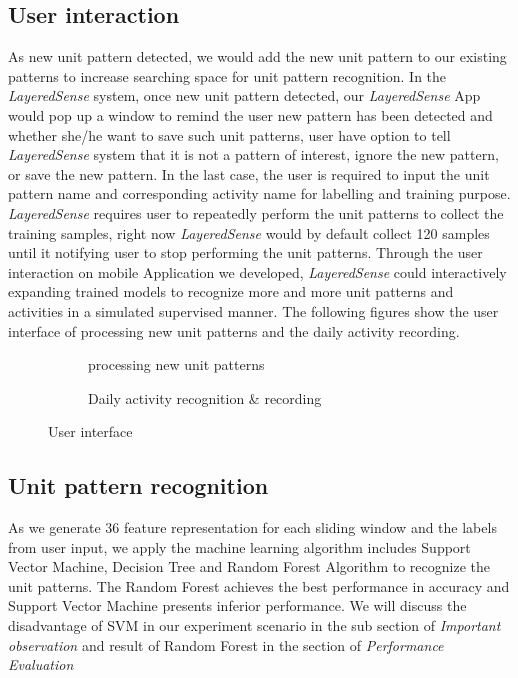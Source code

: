 \documentclass[a4paper, 10pt, conference]{IEEEtran}      %
\begin{document}
\subsection{User interaction}
As new unit pattern detected, we would add the new unit pattern to our existing patterns to increase searching space for unit pattern recognition. In the \emph{LayeredSense} system, once new unit pattern  detected, our \emph{LayeredSense} App would pop up a window to remind the user new pattern has been detected and whether she/he want to save such unit patterns, user have option to tell \emph{LayeredSense} system that it is not a pattern of interest,  ignore the new pattern, or save the new pattern. In the last case, the user is required to input the unit pattern name and corresponding activity name for labelling and training purpose. \emph{LayeredSense} requires user to repeatedly perform the unit patterns to collect the training samples, right now \emph{LayeredSense} would by default collect 120 samples until it notifying user to stop performing the unit patterns. Through the user interaction on mobile Application we developed, \emph{LayeredSense} could interactively expanding trained models to recognize more and more unit patterns and activities in a simulated supervised manner. The following figures show the user interface of processing new unit patterns and the daily activity recording.



\begin{figure}[htb]

\begin{subfigure}{.45\textwidth}
 \centering           
\frame{\texttt{[image: ui2]}}
\caption{processing new unit patterns}
\label{Fig:Data1}
\end{subfigure}

\begin{subfigure}{.45\textwidth}  
\centering
\frame{\texttt{[image: ui1]}}
\caption{Daily activity recognition \& recording}
\label{Fig:Data2}
\end{subfigure}
\caption{User interface}
\end{figure}
   

\subsection{Unit pattern recognition}
As we generate 36 feature representation for each sliding window and the labels from user input, we apply the machine learning algorithm includes Support Vector Machine, Decision Tree and Random Forest Algorithm to recognize the unit patterns. The Random Forest achieves the best performance in accuracy and Support Vector Machine presents inferior performance. We will discuss the disadvantage of SVM in our experiment scenario in the sub section of \emph{Important observation} and result of Random Forest in the section of \emph{Performance Evaluation}  
\end{document}
